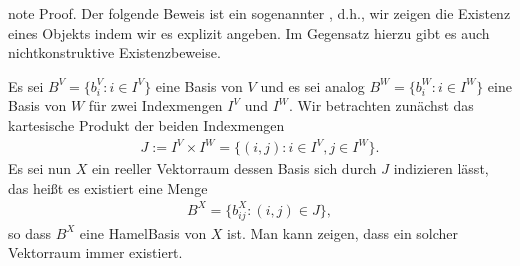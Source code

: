 \documentclass[letterpaper,10pt,german]{jupyterBook}
\begin{document}
\begin{sphinxadmonition}{note}
\sphinxAtStartPar
Proof. Der folgende Beweis ist ein sogenannter , d.h., wir zeigen die Existenz eines Objekts indem wir es explizit angeben.
Im Gegensatz hierzu gibt es auch nicht\sphinxhyphen{}konstruktive Existenzbeweise.

\sphinxAtStartPar
Es sei \(B^V = \{b_i^V: i\in I^V\}\) eine Basis von \(V\) und es sei analog \(B^W = \{b_i^W: i\in I^W\}\) eine Basis von \(W\) für zwei Indexmengen \(I^V\) und \(I^W\).
Wir betrachten zunächst das kartesische Produkt der beiden Indexmengen
\begin{equation*}
\begin{split}J := I^V \times I^W = \{(i,j): i\in I^V, j\in I^W\}.\end{split}
\end{equation*}
\sphinxAtStartPar
Es sei nun \(X\) ein reeller Vektorraum dessen Basis sich durch \(J\) indizieren lässt, das heißt es existiert eine Menge
\begin{equation*}
\begin{split}B^X = \{b_{ij}^X: (i,j)\in J\},\end{split}
\end{equation*}
\sphinxAtStartPar
so dass \(B^X\) eine Hamel\sphinxhyphen{}Basis von \(X\) ist.
Man kann zeigen, dass ein solcher Vektorraum immer existiert.


\end{sphinxadmonition}
\end{document}
